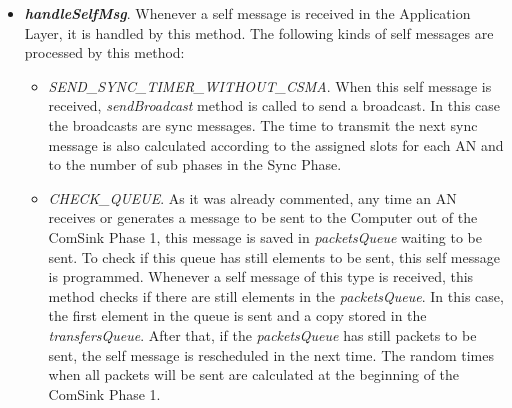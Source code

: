 \begin{itemize}
\begin{itemize}
\begin{itemize}
      \item Report for this \ac{AN}. This report is now deleted but, in future works, it could be used by the Computer to communicate with 
      the \acp{AN}.

      \item Report for a \ac{MN}. This report is for a \ac{MN} to which this \ac{AN} is the selected \ac{AN}. This packet was probably requested
      from the \ac{MN}. In future works, this packet would be saved and sent to the \ac{MN} when requested. Right now is just deleted.
    \end{itemize}
  \end{itemize}

  \item \textbf{\textit{handleSelfMsg}}. Whenever a self message is received in the Application Layer, it is handled by this method. The 
  following kinds of self messages are processed by this method:
  \begin{itemize}
    \item \textit{SEND\_SYNC\_TIMER\_WITHOUT\_CSMA}. When this self message is received, \textit{sendBroadcast} method is called to send 
    a broadcast. In this case the broadcasts are sync messages. The time to transmit the next sync message is also calculated according 
    to the assigned slots for each \ac{AN} and to the number of sub phases in the Sync Phase.

    \item \textit{CHECK\_QUEUE}. As it was already commented, any time an \ac{AN} receives or generates a message to be sent to the Computer 
    out of the ComSink Phase 1, this message is saved in \textit{packetsQueue} waiting to be sent. To check if this queue has still elements 
    to be sent, this self message is programmed. Whenever a self message of this type is received, this method checks if there are still 
    elements in the \textit{packetsQueue}. In this case, the first element in the queue is sent and a copy stored in the \textit{transfersQueue}.
    After that, if the \textit{packetsQueue} has still packets to be sent, the self message is rescheduled in the next time. The random times 
    when all packets will be sent are calculated at the beginning of the ComSink Phase 1.


\end{itemize}
\end{itemize}
